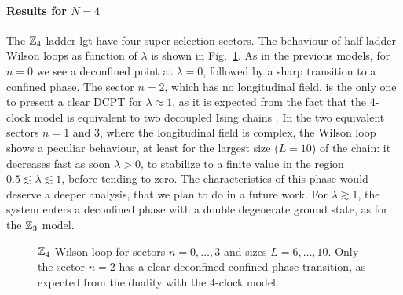 \paragraph{Results for \texorpdfstring{$N=4$}{N=4}}%
The $\Z_4$ ladder \ac{lgt} have four super-selection sectors.
The behaviour of half-ladder Wilson loops as function of $\lambda$ is shown in Fig.~\ref{fig:z4_wilson}.
As in the previous models, for $n=0$ we see a deconfined point at $\lambda = 0$, followed by a sharp transition to a confined phase.
The sector $n=2$, which has no longitudinal field, is the only one to present a clear DCPT for $\lambda \approx 1$, as it is expected from the fact that the $4$-clock model is equivalent to two decoupled Ising chains \cite{ortiz2012dualities}.
In the two equivalent sectors $n=1$ and $3$, where the longitudinal field is complex, the Wilson loop shows a peculiar behaviour, at least for the largest size ($L=10$) of the chain: it decreases fast as soon $\lambda > 0$, to stabilize to a finite value in the region $0.5 \lesssim \lambda \lesssim 1$, before tending to zero.
The characteristics of this phase would deserve a deeper analysis, that we plan to do in a future work.
For $\lambda \gtrsim 1$, the system enters a deconfined phase with a double degenerate ground state, as for the $\mathbb{Z}_3$ model.


\begin{figure}[t]
    \centering
    
    \vspace*{-10pt}
    \caption[Wilson loops for the $\Z_4$ ladder \ac{lgt}]{$\Z_4$ Wilson loop for sectors $n=0, \dots, 3$ and sizes $L=6, \dots, 10$.
        Only the sector $n = 2$ has a clear deconfined-confined phase transition, as expected from the duality with the $4$-clock model.
    }
    \label{fig:z4_wilson}
\end{figure}

\smallskip

%

